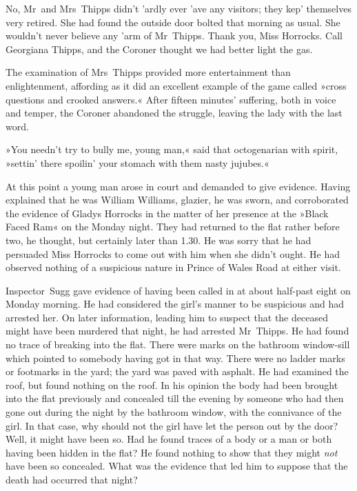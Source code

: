 No, Mr~and Mrs~Thipps didn't 'ardly ever 'ave any visitors; they kep' themselves very retired. She had found the outside door bolted that morning as usual. She wouldn't never believe any 'arm of Mr~Thipps. Thank you, Miss Horrocks. Call Georgiana Thipps, and the Coroner thought we had better light the gas.

The examination of Mrs~Thipps provided more entertainment than enlightenment, affording as it did an excellent example of the game called »cross questions and crooked answers.« After fifteen minutes' suffering, both in voice and temper, the Coroner abandoned the struggle, leaving the lady with the last word.

»You needn't try to bully me, young man,« said that octogenarian with spirit, »settin' there spoilin' your stomach with them nasty jujubes.«

At this point a young man arose in court and demanded to give evidence. Having explained that he was William Williams, glazier, he was sworn, and corroborated the evidence of Gladys Horrocks in the matter of her presence at the »Black Faced Ram« on the Monday night. They had returned to the flat rather before two, he thought, but certainly later than 1.30. He was sorry that he had persuaded Miss Horrocks to come out with him when she didn't ought. He had observed nothing of a suspicious nature in Prince of Wales Road at either visit.

Inspector~Sugg gave evidence of having been called in at about half-past eight on Monday morning. He had considered the girl's manner to be suspicious and had arrested her. On later information, leading him to suspect that the deceased might have been murdered that night, he had arrested Mr~Thipps. He had found no trace of breaking into the flat. There were marks on the bathroom window-sill which pointed to somebody having got in that way. There were no ladder marks or footmarks in the yard; the yard was paved with asphalt. He had examined the roof, but found nothing on the roof. In his opinion the body had been brought into the flat previously and concealed till the evening by someone who had then gone out during the night by the bathroom window, with the connivance of the girl. In that case, why should not the girl have let the person out by the door? Well, it might have been so. Had he found traces of a body or a man or both having been hidden in the flat? He found nothing to show that they might \textit{not} have been so concealed. What was the evidence that led him to suppose that the death had occurred that night?

